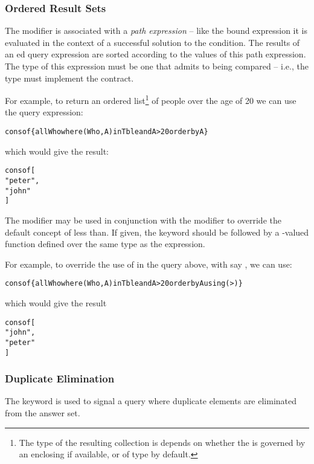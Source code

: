 \subsubsection{Ordered Result Sets}
The  modifier is associated with a \emph{path expression} -- like the bound expression it is evaluated in the context of a successful solution to the condition. The results of an ed query expression are sorted according to the values of this path expression. The type of this expression must be one that admits to being compared -- i.e., the type must implement the  contract.

For example, to return an ordered  list\footnote{The type of the resulting collection is depends on whether the  is governed by an enclosing  if available, or of type  by default.} of people over the age of 20 we can use the query expression:
\begin{alltt}
cons of \{ all Who where (Who,A) in Tble and A>20 order by A\}
\end{alltt}
which would give the result:
\begin{alltt}
cons of [
  "peter",
  "john"
]
\end{alltt}

The  modifier may be used in conjunction with the  modifier to override the default concept of less than. If given, the  keyword should be followed by a -valued function defined over the same type as the  expression.

For example, to override the use of \q{<} in the  query above, with say \q{>}, we can use:
\begin{alltt}
cons of \{ all Who where (Who,A) in Tble and A>20 order by A using (>)\}
\end{alltt}
which would give the result
\begin{alltt}
cons of [
  "john",
  "peter"
]
\end{alltt}

\subsubsection{Duplicate Elimination}
\label{duplicateElim}

The  keyword is used to signal a query where duplicate elements are eliminated from the answer set.

